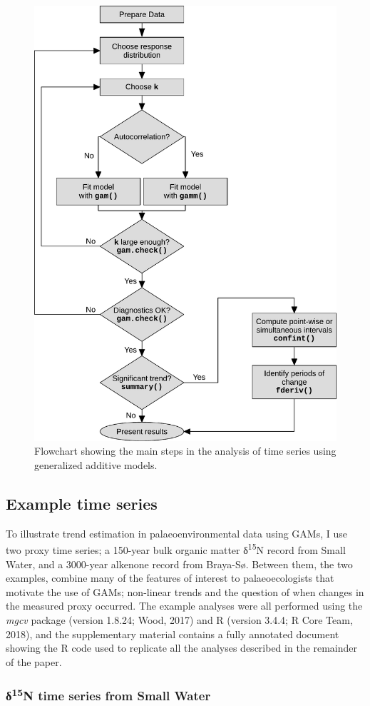 \documentclass[12pt,]{article}
\begin{document}
\begin{figure}

{\centering \includegraphics[width=0.4\linewidth]{manual-figures/flow-diagram} 

}

\caption{Flowchart showing the main steps in the analysis of time series using generalized additive models.}\label{fig:flowchart}
\end{figure}

\subsection{Example time series}\label{example-time-series}

To illustrate trend estimation in palaeoenvironmental data using GAMs, I
use two proxy time series; a 150-year bulk organic matter
δ\textsuperscript{15}N record from Small Water, and a 3000-year alkenone
record from Braya-Sø. Between them, the two examples, combine many of
the features of interest to palaeoecologists that motivate the use of
GAMs; non-linear trends and the question of when changes in the measured
proxy occurred. The example analyses were all performed using the
\emph{mgcv} package (version 1.8.24; Wood, 2017) and R (version 3.4.4; R
Core Team, 2018), and the supplementary material contains a fully
annotated document showing the R code used to replicate all the analyses
described in the remainder of the paper.

\subsubsection{\texorpdfstring{δ\textsuperscript{15}N time series from
Small
Water}{δ15N time series from Small Water}}\label{15n-time-series-from-small-water}
\end{document}
